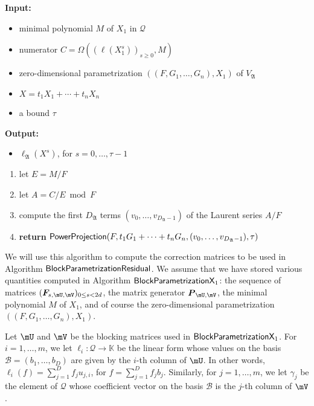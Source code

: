 \documentclass[12pt]{article}
\newcommand{\mat}[1]{\bm{\MakeUppercase{#1}}} %
\newcommand{\seqelt}[1]{\bm{F}_{#1}} %
\newcommand{\basis}{\mathscr{B}}
\newcommand{\mainalgoname}{\mathsf{ BlockParametrization}}
\newcommand{\lf}{X}
\newcommand{\residueI}{\mathscr{Q}}
\def\K{\mathbb{K}}
\def\K {\ensuremath{\mathbb{K}}}
\begin{document}
\begin{algorithm}[H]
	\caption{${\sf Decompose}(M, C, ((F,G_1,\dots,G_n),X_1), \lf,\tau)$} {\bf
          Input:} \vspace{-0.5em}
	\begin{itemize}
		\item minimal polynomial $M$ of $X_1$ in $\residueI$
		\item numerator $C=\Omega( (\ell(X_1^s))_{s \ge 0}, M)$
                \item zero-dimensional parametrization $((F,G_1,\dots,G_n),X_1)$ of $V_\mathfrak{A}$
                \item $\lf =t_1 X_1 + \cdots + t_n X_n$
                \item a bound $\tau$
	\end{itemize}
	{\bf Output:}  \vspace{-0.5em}
        \begin{itemize}
        \item $\ell_\mathfrak{A}(\lf^s)$, for $s=0,\dots,\tau-1$
        \end{itemize}
  \begin{enumerate}
  \item let $E=M/F$
  \item let $A=C/E \bmod F$
  \item compute the first $D_\mathfrak{A}$ terms $(v_0,\dots,v_{D_\mathfrak{A}-1})$ of the Laurent series $A/F$
  \item {\bf return} ${\sf PowerProjection}(F, t_1 G_1 + \cdots + t_n G_n, (v_0,\dots,v_{D_\mathfrak{A}-1}),\tau)$
  \end{enumerate}
\end{algorithm}

We will use this algorithm to compute the correction matrices to be
used in Algorithm $\mainalgoname{\sf Residual}$. We assume that we
have stored various quantities computed in Algorithm
$\mainalgoname{\sf X}_1$: the sequence of matrices
$(\seqelt{s,\mU,\mV})_{0 \le s < 2d}$, the matrix generator
$\mat{P}_{\mU,\mV}$, the minimal polynomial $M$ of $X_1$, and of
course the zero-dimensional parametrization $((F,G_1,\dots,G_n),X_1)$.


Let $\mU$ and $\mV$ be the blocking matrices used in
$\mainalgoname{\sf X}_1$. For $i=1,\dots,m$, we let
$\ell_i: \residueI \to \K$ be the linear form whose values on the
basis $\basis=(b_1,\dots,b_D)$ are given by the $i$-th column of
$\mU$. In other words, $\ell_i(f) = \sum_{j=1}^D f_j u_{j,i}$, for
$f=\sum_{j=1}^D f_j b_j$. Similarly, for $j=1,\dots,m$, we let
$\gamma_j$ be the element of $\residueI$ whose coefficient vector on
the basis $\basis$ is the $j$-th column of $\mV$.
\end{document}
